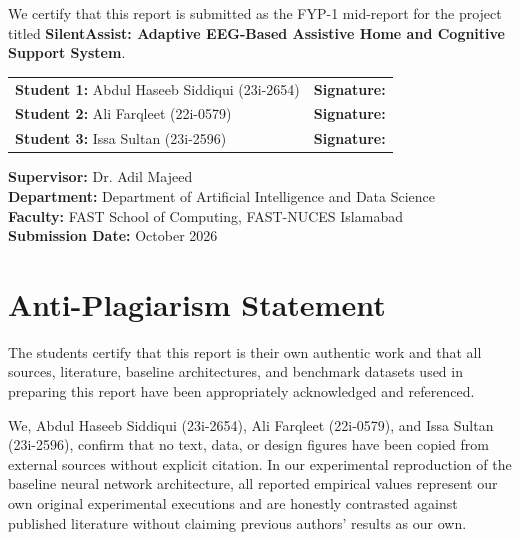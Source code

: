 \documentclass[12pt,a4paper]{report}
\begin{document}
We certify that this report is submitted as the FYP-1 mid-report for the project titled \textbf{SilentAssist: Adaptive EEG-Based Assistive Home and Cognitive Support System}.\\[1.5cm]

\noindent
\begin{tabular}{@{}ll@{}}
\textbf{Student 1:} Abdul Haseeb Siddiqui (23i-2654) & \textbf{Signature:} \underline{\hspace{5.5cm}} \\[1.2cm]
\textbf{Student 2:} Ali Farqleet (22i-0579)          & \textbf{Signature:} \underline{\hspace{5.5cm}} \\[1.2cm]
\textbf{Student 3:} Issa Sultan (23i-2596)           & \textbf{Signature:} \underline{\hspace{5.5cm}} \\[1.5cm]
\end{tabular}

\vspace{0.8cm}
\noindent
\textbf{Supervisor:} Dr. Adil Majeed \\[0.2cm]
\textbf{Department:} Department of Artificial Intelligence and Data Science \\[0.2cm]
\textbf{Faculty:} FAST School of Computing, FAST-NUCES Islamabad \\[0.2cm]
\textbf{Submission Date:} October 2026

\newpage
\chapter*{Anti-Plagiarism Statement}

The students certify that this report is their own authentic work and that all sources, literature, baseline architectures, and benchmark datasets used in preparing this report have been appropriately acknowledged and referenced.

We, Abdul Haseeb Siddiqui (23i-2654), Ali Farqleet (22i-0579), and Issa Sultan (23i-2596), confirm that no text, data, or design figures have been copied from external sources without explicit citation. In our experimental reproduction of the baseline neural network architecture, all reported empirical values represent our own original experimental executions and are honestly contrasted against published literature without claiming previous authors' results as our own.
\end{document}
